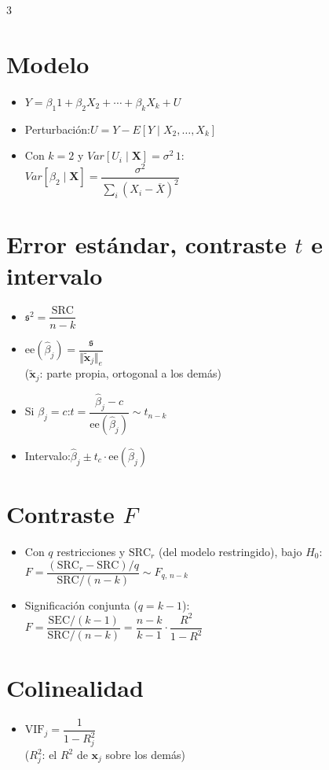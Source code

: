 \documentclass[10pt]{article}
\newcommand{\vv}[1]{\boldsymbol{#1}}
\newcommand{\norma}[1]{\Vert #1\Vert}
\newcommand{\s}{\mathfrak{s}}
\newcommand{\SRC}{\mathrm{SRC}}\newcommand{\SEC}{\mathrm{SEC}}\newcommand{\STC}{\mathrm{STC}}
\newcommand{\ee}{\mathrm{ee}}
\begin{document}
\begin{multicols}{3}
\section{Modelo}
\begin{itemize}
\item $Y=\beta_1\mathit 1+\beta_2X_2+\cdots+\beta_kX_k+U$
\item Perturbación:\quad $U=Y-E[Y\mid X_2,\ldots,X_k]$
\item Con $k=2$ y $Var[U_i\mid\vv X]=\sigma^2\,\mathit 1$:\\[2pt]
 $Var[\hat\beta_2\mid\vv X]=\dfrac{\sigma^2}{\sum_i(X_i-\overline X)^2}$
\end{itemize}

\section{Error estándar, contraste $t$ e intervalo}
\begin{itemize}
\item $\s^2=\dfrac{\SRC}{n-k}$
\item $\ee(\hat\beta_j)=\dfrac{\s}{\norma{\tilde{\vv x}_j}_e}$\\[2pt] ($\tilde{\vv x}_j$: parte propia, ortogonal a los demás)
\item Si $\beta_j=c$:\quad $t=\dfrac{\hat\beta_j-c}{\ee(\hat\beta_j)}\sim t_{n-k}$
\item Intervalo:\quad $\hat\beta_j\pm t_c\cdot\ee(\hat\beta_j)$
\end{itemize}

\columnbreak
\section{Contraste $F$}
\begin{itemize}
\item Con $q$ restricciones y $\SRC_r$ (del modelo restringido), bajo $H_0$:\\[3pt]
 $F=\dfrac{(\SRC_r-\SRC)/q}{\SRC/(n-k)}\sim F_{q,\,n-k}$
\item Significación conjunta ($q=k-1$):\\[3pt]
 $F=\dfrac{\SEC/(k-1)}{\SRC/(n-k)}=\dfrac{n-k}{k-1}\cdot\dfrac{R^2}{1-R^2}$
\end{itemize}

\section{Colinealidad}
\begin{itemize}
\item $\mathrm{VIF}_j=\dfrac{1}{1-R_j^2}$\\[2pt] ($R_j^2$: el $R^2$ de $\vv x_j$ sobre los demás)
\end{itemize}


\end{multicols}
\end{document}
